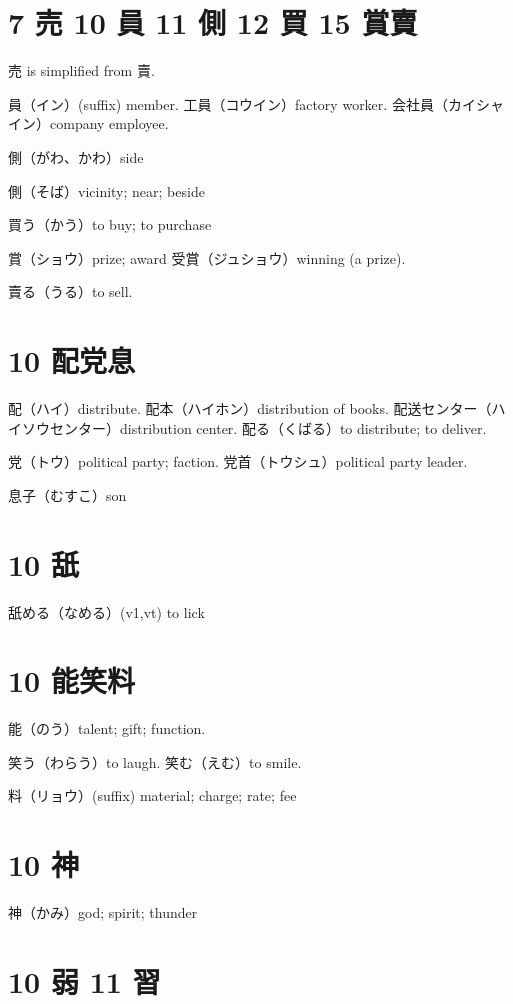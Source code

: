 \section{7 売 10 員 11 側 12 買 15 賞賣}

売 is simplified from 賣.

員（イン）(suffix) member.
工員（コウイン）factory worker.
会社員（カイシャイン）company employee.

側（がわ、かわ）side

側（そば）vicinity; near; beside

買う（かう）to buy; to purchase

賞（ショウ）prize; award
受賞（ジュショウ）winning (a prize).

賣る（うる）to sell.

\section{10 配党息}

配（ハイ）distribute.
配本（ハイホン）distribution of books.
配送センター（ハイソウセンター）distribution center.
配る（くばる）to distribute; to deliver.

党（トウ）political party; faction.
党首（トウシュ）political party leader.

息子（むすこ）son

\section{10 舐}

舐める（なめる）(v1,vt) to lick

\section{10 能笑料}

能（のう）talent; gift; function.

笑う（わらう）to laugh.
笑む（えむ）to smile.

料（リョウ）(suffix) material; charge; rate; fee

\section{10 神}

神（かみ）god; spirit; thunder

\section{10 弱 11 習}

